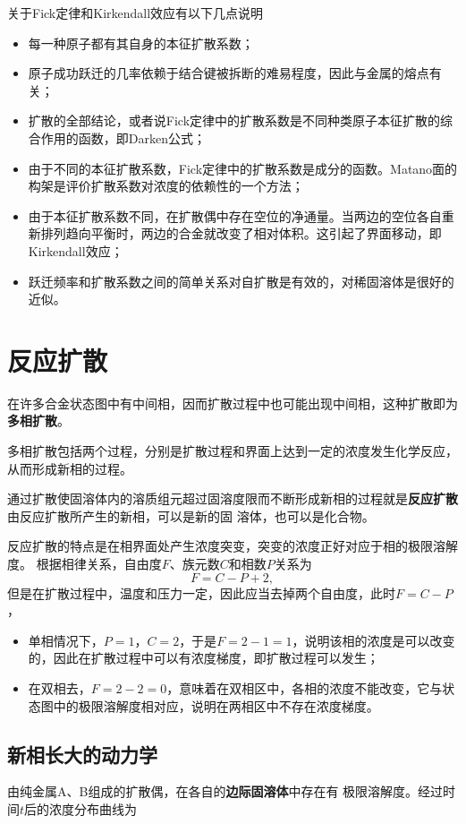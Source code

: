             关于Fick定律和Kirkendall效应有以下几点说明
            \begin{itemize}
                \item 每一种原子都有其自身的本征扩散系数；
                \item 原子成功跃迁的几率依赖于结合键被拆断的难易程度，因此与金属的熔点有关；
                \item 扩散的全部结论，或者说Fick定律中的扩散系数是不同种类原子本征扩散的综合作用的函数，即Darken公式；
                \item 由于不同的本征扩散系数，Fick定律中的扩散系数是成分的函数。Matano面的构架是评价扩散系数对浓度的依赖性的一个方法；
                \item 由于本征扩散系数不同，在扩散偶中存在空位的净通量。当两边的空位各自重新排列趋向平衡时，两边的合金就改变了相对体积。这引起了界面移动，即Kirkendall效应；
                \item 跃迁频率和扩散系数之间的简单关系对自扩散是有效的，对稀固溶体是很好的近似。
            \end{itemize}
    \section{反应扩散}
        在许多合金状态图中有中间相，因而扩散过程中也可能出现中间相，这种扩散即为\textbf{多相扩散}。

        多相扩散包括两个过程，分别是扩散过程和界面上达到一定的浓度发生化学反应，从而形成新相的过程。

        通过扩散使固溶体内的溶质组元超过固溶度限而不断形成新相的过程就是\textbf{反应扩散}由反应扩散所产生的新相，可以是新的固
        溶体，也可以是化合物。

        反应扩散的特点是在相界面处产生浓度突变，突变的浓度正好对应于相的极限溶解度。
        根据相律关系，自由度$F$、族元数$C$和相数$P$关系为
        \begin{equation}
            F=C-P+2,
        \end{equation}
        但是在扩散过程中，温度和压力一定，因此应当去掉两个自由度，此时$F=C-P$，
        \begin{itemize}
            \item 单相情况下，$P=1$，$C=2$，于是$F=2-1=1$，说明该相的浓度是可以改变的，因此在扩散过程中可以有浓度梯度，即扩散过程可以发生；
            \item 在双相去，$F=2-2=0$，意味着在双相区中，各相的浓度不能改变，它与状态图中的极限溶解度相对应，说明在两相区中不存在浓度梯度。
        \end{itemize}
        
        \subsection{新相长大的动力学}
            由纯金属A、B组成的扩散偶，在各自的\textbf{边际固溶体}中存在有
            极限溶解度。经过时间$t$后的浓度分布曲线为